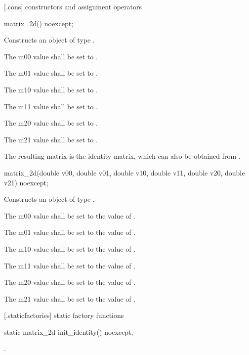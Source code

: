  [\matrixtwod.cons] { constructors and assignment operators}

\begin{itemdecl}
	matrix_2d() noexcept;
\end{itemdecl}
\begin{itemdescr}
	\pnum
	\effects
	Constructs an object of type .
	
	\pnum
	The m00 value shall be set to .
	
	\pnum
	The m01 value shall be set to .
	
	\pnum
	The m10 value shall be set to .
	
	\pnum
	The m11 value shall be set to .
	
	\pnum
	The m20 value shall be set to .
	
	\pnum
	The m21 value shall be set to .
	
	\pnum
	\realnote
	The resulting matrix is the identity matrix, which can also be obtained from .
\end{itemdescr}

\begin{itemdecl}
    matrix_2d(double v00, double v01, double v10, double v11,
      double v20, double v21) noexcept;
\end{itemdecl}
\begin{itemdescr}
	\pnum
	\effects
	Constructs an object of type .
	
	\pnum
	The m00 value shall be set to the value of .
	
	\pnum
	The m01 value shall be set to the value of .
	
	\pnum
	The m10 value shall be set to the value of .
	
	\pnum
	The m11 value shall be set to the value of .
	
	\pnum
	The m20 value shall be set to the value of .
	
	\pnum
	The m21 value shall be set to the value of .
\end{itemdescr}

 [\matrixtwod.staticfactories] { static factory 
functions}

\begin{itemdecl}
static matrix_2d init_identity() noexcept;
\end{itemdecl}
\begin{itemdescr}
	\pnum
	\returns
	.
\end{itemdescr}

